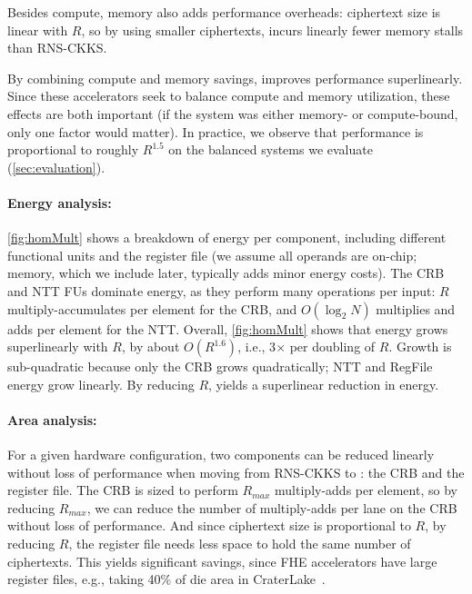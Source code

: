 Besides compute, memory also adds performance overheads:
ciphertext size is linear with $R$,
so by using smaller ciphertexts,
\name incurs linearly fewer memory stalls than RNS-CKKS.

By combining compute and memory savings, \name improves performance superlinearly.
Since these accelerators seek to balance compute and memory utilization, 
these effects are both important (if the system was either memory- or compute-bound, only one factor would matter).
In practice, we observe that performance is proportional to roughly $R^{1.5}$
on the balanced systems we evaluate (\autoref{sec:evaluation}).

\figHomMult

\paragraph{Energy analysis:}
\autoref{fig:homMult} shows a breakdown of energy per component, including
different functional units and the register file (we assume all operands are
on-chip; memory, which we include later, typically adds minor energy costs).
The CRB and NTT FUs dominate energy, as they perform many operations per
input: $R$ multiply-accumulates per element for the CRB, and $O(\log_2 N)$ multiplies and
adds per element for the NTT.
Overall, \autoref{fig:homMult} shows that energy grows superlinearly with $R$, by about $O(R^{1.6})$, i.e.,
3$\times$ per doubling of $R$.
Growth is sub-quadratic because only the CRB grows quadratically; NTT and
RegFile energy grow linearly.
By reducing $R$, \name yields a superlinear reduction in energy.

\paragraph{Area analysis:}
For a given hardware configuration, two components can be reduced linearly
without loss of performance when moving from RNS-CKKS to \name:
the CRB and the register file.
The CRB is sized to perform $R_{max}$ multiply-adds per element, so by reducing $R_{max}$,
we can reduce the number of multiply-adds per lane on the CRB without loss of performance.
And since ciphertext size is proportional to $R$, by reducing $R$,
the register file needs less space to hold the same number of ciphertexts.
This yields significant savings, since FHE accelerators have large register files,
e.g., taking 40\% of die area in CraterLake~\cite[Table 2]{samardzic:isca22:craterlake}.

